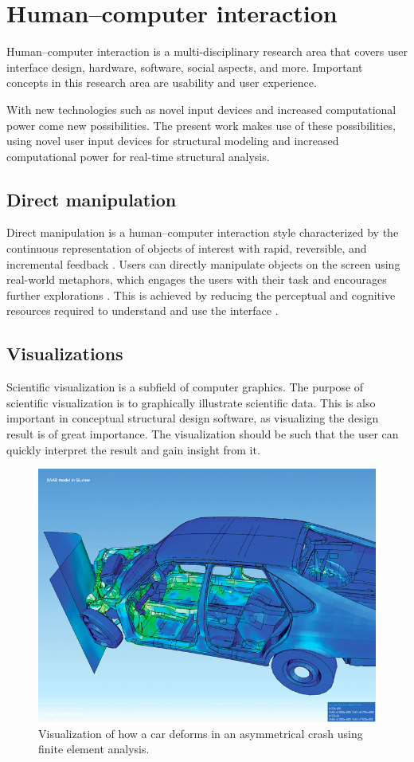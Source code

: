 \chapter{Human--computer interaction}
\label{ch:Human-computer interaction}
Human--computer interaction is a multi-disciplinary research area that covers user interface design, hardware, software, social aspects, and more. Important concepts in this research area are usability and user experience.

With new technologies such as novel input devices and increased computational power come new possibilities. The present work makes use of these possibilities, using novel user input devices for structural modeling and increased computational power for real-time structural analysis. 

\section{Direct manipulation}
Direct manipulation is a human--computer interaction style characterized by the continuous representation of objects of interest with rapid, reversible, and incremental feedback \cite{Shneiderman1982}. Users can directly manipulate objects on the screen using real-world metaphors, which engages the users with their task and encourages further explorations \cite{Shneiderman:1997:DMC:238218.238281}. This is achieved by reducing the perceptual and cognitive resources required to understand and use the interface \cite{Sears1990}.

\section{Visualizations}
Scientific visualization is a subfield of computer graphics. The purpose of scientific visualization is to graphically illustrate scientific data. This is also important in conceptual structural design software, as visualizing the design result is of great importance. The visualization should be such that the user can quickly interpret the result and gain insight from it. 

\begin{figure}
  \includegraphics[width=320pt]{graphics/car.jpg}
  \caption{Visualization of how a car deforms in an asymmetrical crash using finite element analysis.}
  \label{fig:Car}
\end{figure}


